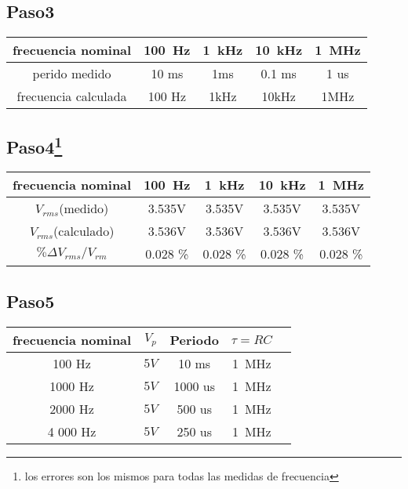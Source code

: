 \documentclass[a4paper,12pt]{article}
\begin{document}
\subsection*{Paso3}

\begin{center}
 \begin{tabular}{|c|| c c c c|} 
 \hline
 frecuencia nominal & \SI{100}{\hertz} & \SI{1}{\kilo\hertz} & \SI{10}{\kilo\hertz} & \SI{1}{\mega\hertz}  \\  
 \hline\hline
 perido medido & 10 ms & 1ms & 0.1 ms & 1 us \\
 \hline
 frecuencia calculada & 100 Hz & 1kHz & 10kHz & 1MHz \\
 \hline
\end{tabular}
\end{center}

\subsection*{Paso4\footnote{los errores son los mismos para todas las medidas de frecuencia}}

\begin{center}
 \begin{tabular}{|c|| c c c c|} 
 \hline
 frecuencia nominal & \SI{100}{\hertz} & \SI{1}{\kilo\hertz} & \SI{10}{\kilo\hertz} & \SI{1}{\mega\hertz}  \\  
 \hline\hline
$V_{rms}$(medido) & 3.535V & 3.535V  & 3.535V  & 3.535V  \\ 
 \hline
$V_{rms}$(calculado)& 3.536V & 3.536V & 3.536V & 3.536V \\
 \hline 
  $\% \varDelta V_{rms}/V_{rm} $ & 0.028 \% & 0.028 \% & 0.028 \% & 0.028 \%\\
 \hline
\end{tabular}
\end{center}


\newpage

\subsection*{Paso5}


\begin{center}
 \begin{tabular}{|c| c | c | c | c|} 
 \hline
 frecuencia nominal & $V_p$ & Periodo & $ \tau = RC $  \\  
 \hline\hline
 100 Hz & $5 V$ & 10 ms & \SI{1}{\mega\hertz}  \\   
 \hline
 1000 Hz  & $5 V$ & 1000 us & \SI{1}{\mega\hertz}  \\  
 \hline 
 2000 Hz & $5 V$ & 500 us & \SI{1}{\mega\hertz}  \\  
 \hline
  4	000 Hz & $5 V$ & 250 us & \SI{1}{\mega\hertz}  \\  
  \hline
\end{tabular}
\end{center}
\end{document}
